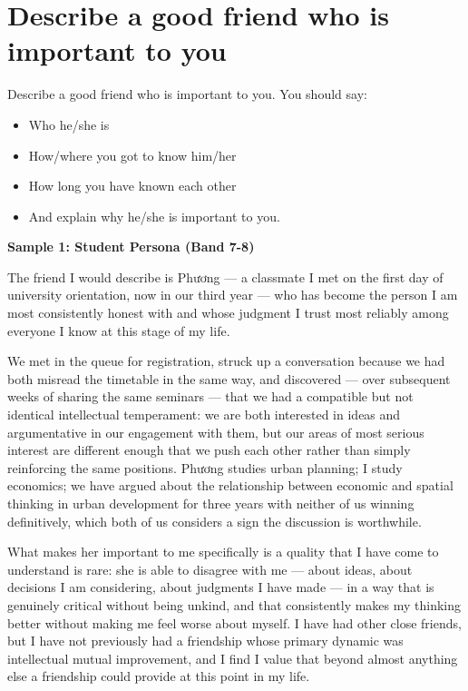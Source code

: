 \section{Describe a good friend who is important to you}
\begin{ieltsprompt}
Describe a good friend who is important to you.
You should say:
\begin{itemize}[leftmargin=2em, itemsep=2pt]
\item Who he/she is
\item How/where you got to know him/her
\item How long you have known each other
\item And explain why he/she is important to you.
\end{itemize}
\end{ieltsprompt}
\begin{ieltsanswer}
\textbf{Sample 1: Student Persona (Band 7-8)}

The friend I would describe is Phương — a classmate I met on the first day of university orientation, now in our third year — who has become the person I am most consistently honest with and whose judgment I trust most reliably among everyone I know at this stage of my life.

We met in the queue for registration, struck up a conversation because we had both misread the timetable in the same way, and discovered — over subsequent weeks of sharing the same seminars — that we had a compatible but not identical intellectual temperament: we are both interested in ideas and argumentative in our engagement with them, but our areas of most serious interest are different enough that we push each other rather than simply reinforcing the same positions. Phương studies urban planning; I study economics; we have argued about the relationship between economic and spatial thinking in urban development for three years with neither of us winning definitively, which both of us considers a sign the discussion is worthwhile.

What makes her important to me specifically is a quality that I have come to understand is rare: she is able to disagree with me — about ideas, about decisions I am considering, about judgments I have made — in a way that is genuinely critical without being unkind, and that consistently makes my thinking better without making me feel worse about myself. I have had other close friends, but I have not previously had a friendship whose primary dynamic was intellectual mutual improvement, and I find I value that beyond almost anything else a friendship could provide at this point in my life.


\end{ieltsanswer}

